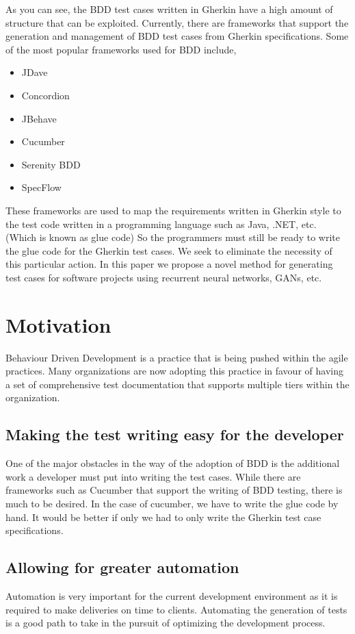 \documentclass[conference]{IEEEtran}
\begin{document}
As you can see, the BDD test cases written in Gherkin have a high amount of structure that can be exploited. Currently, there are frameworks that support the generation and management of BDD test cases from Gherkin specifications. Some of the most popular frameworks used for BDD include,

\begin{itemize}
	\item JDave 
	\item Concordion 
	\item JBehave 
	\item Cucumber
	\item Serenity BDD
	\item SpecFlow   
\end{itemize}
These frameworks are used to map the requirements written in Gherkin style to the test code written in a programming language such as Java, .NET, etc. (Which is known as glue code\cite{a2}) So the programmers must still be ready to write the glue code for the Gherkin test cases. We seek to eliminate the necessity of this particular action.
In this paper we propose a novel method for generating test cases for software projects using recurrent neural networks, GANs, etc.

\section{Motivation}
Behaviour Driven Development is a practice that is being pushed within the agile practices. Many organizations are now adopting this practice in favour of having a set of comprehensive test documentation that supports multiple tiers within the organization.
\subsection{Making the test writing easy for the developer}
One of the major obstacles in the way of the adoption of BDD is the additional work a developer must put into writing the test cases. While there are frameworks such as Cucumber that support the writing of BDD testing, there is much to be desired. In the case of cucumber, we have to write the glue code by hand. It would be better if only we had to only write the Gherkin test case specifications.
\subsection{Allowing for greater automation}
Automation is very important for the current development environment as it is required to make deliveries on time to clients. Automating the generation of tests is a good path to take in the pursuit of optimizing the development process.
\end{document}

